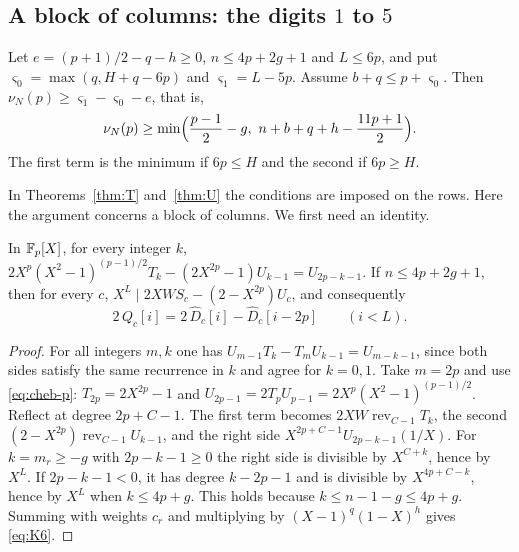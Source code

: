 \subsection{A block of columns: the digits $1$ to $5$}
\begin{theorem}\label{thm:U6}
Let $e=(p+1)/2-q-h\ge0$, $n\le4p+2g+1$ and $L\le6p$, and put $\varsigma_0=\max(q,H+q-6p)$ and
$\varsigma_1=L-5p$. Assume $b+q\le p+\varsigma_0$. Then $\nu_N(p)\ge\varsigma_1-\varsigma_0-e$, that is,
\[
 \nu_N(p)\ge\min\Bigl(\frac{p-1}2-g,\ n+b+q+h-\frac{11p+1}2\Bigr).
\]
The first term is the minimum if $6p\le H$ and the second if $6p\ge H$.
\end{theorem}

In Theorems~\ref{thm:T} and~\ref{thm:U} the conditions are imposed on the rows. Here the argument concerns a
block of columns. We first need an identity.

\begin{lemma}\label{lem:K6}
In $\mathbb F_p[X]$, for every integer $k$, $2X^p(X^2-1)^{(p-1)/2}T_k-(2X^{2p}-1)U_{k-1}=U_{2p-k-1}$. If
$n\le4p+2g+1$, then for every $c$, $X^L\mid 2XWS_c-(2-X^{2p})U_c$, and consequently
\begin{equation}\label{eq:K6}
 2\,Q_c[i]=2\,\widehat D_c[i]-\widehat D_c[i-2p]\qquad(i<L).
\end{equation}
\end{lemma}

\begin{proof}
For all integers $m,k$ one has $U_{m-1}T_k-T_mU_{k-1}=U_{m-k-1}$, since both sides satisfy the same
recurrence in $k$ and agree for $k=0,1$. Take $m=2p$ and use \eqref{eq:cheb-p}: $T_{2p}=2X^{2p}-1$ and
$U_{2p-1}=2T_pU_{p-1}=2X^p(X^2-1)^{(p-1)/2}$. Reflect at degree $2p+C-1$. The first term becomes
$2XW\operatorname{rev}_{C-1}T_k$, the second $(2-X^{2p})\operatorname{rev}_{C-1}U_{k-1}$, and the right side
$X^{2p+C-1}U_{2p-k-1}(1/X)$. For $k=m_r\ge-g$ with $2p-k-1\ge0$ the right side is divisible by $X^{C+k}$, hence
by $X^L$. If $2p-k-1<0$, it has degree $k-2p-1$ and is divisible by $X^{4p+C-k}$, hence by $X^L$ when
$k\le4p+g$. This holds because $k\le n-1-g\le4p+g$. Summing with weights $c_r$ and multiplying by
$(X-1)^q(1-X)^h$ gives \eqref{eq:K6}.
\end{proof}

